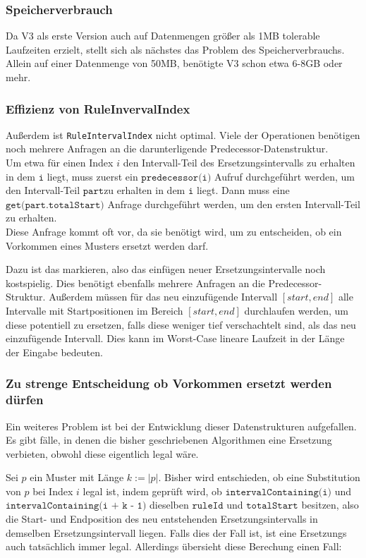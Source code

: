 \subsubsection{Speicherverbrauch}
Da V3 als erste Version auch auf Datenmengen größer als 1MB tolerable Laufzeiten erzielt, stellt sich als nächstes das Problem des Speicherverbrauchs. Allein auf einer Datenmenge von 50MB, benötigte V3 schon etwa 6-8GB oder mehr.

\subsubsection{Effizienz von RuleInvervalIndex}

Außerdem ist \texttt{RuleIntervalIndex} nicht optimal. Viele der Operationen benötigen noch mehrere Anfragen an die darunterligende Predecessor-Datenstruktur.\\
Um etwa für einen Index $i$ den Intervall-Teil des Ersetzungsintervalls zu erhalten in dem $\texttt{i}$ liegt, muss zuerst ein $\texttt{predecessor(i)}$ Aufruf durchgeführt werden, um den Intervall-Teil $\texttt{part}$zu erhalten in dem $\texttt{i}$ liegt. Dann muss eine $\texttt{get(part.totalStart)}$ Anfrage durchgeführt werden, um den ersten Intervall-Teil zu erhalten.\\
Diese Anfrage kommt oft vor, da sie benötigt wird, um zu entscheiden, ob ein Vorkommen eines Musters ersetzt werden darf.

Dazu ist das markieren, also das einfügen neuer Ersetzungsintervalle noch kostspielig. Dies benötigt ebenfalls mehrere Anfragen an die Predecessor-Struktur. Außerdem müssen für das neu einzufügende Intervall $[start, end]$ alle Intervalle mit Startpositionen im Bereich $[start, end]$ durchlaufen werden, um diese potentiell zu ersetzen, falls diese weniger tief verschachtelt sind, als das neu einzufügende Intervall. Dies kann im Worst-Case lineare Laufzeit in der Länge der Eingabe bedeuten.

\subsubsection{Zu strenge Entscheidung ob Vorkommen ersetzt werden dürfen}
\label{strictdecision}
Ein weiteres Problem ist bei der Entwicklung dieser Datenstrukturen aufgefallen. Es gibt fälle, in denen die bisher geschriebenen Algorithmen eine Ersetzung verbieten, obwohl diese eigentlich legal wäre.

Sei $p$ ein Muster mit Länge $k := |p|$. Bisher wird entschieden, ob eine Substitution von $p$ bei Index $i$ legal ist, indem geprüft wird, ob $\texttt{intervalContaining(i)}$ und $\texttt{intervalContaining(i + k - 1)}$ dieselben $\texttt{ruleId}$ und $\texttt{totalStart}$ besitzen, also die Start- und Endposition des neu entstehenden Ersetzungsintervalls in demselben Ersetzungsintervall liegen. Falls dies der Fall ist, ist eine Ersetzungs auch tatsächlich immer legal. Allerdings übersieht diese Berechung einen Fall:

